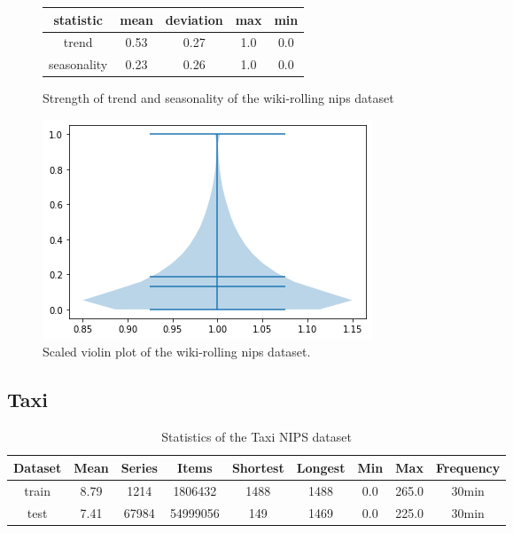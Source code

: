 \begin{figure}[htb]
  \centering
  \begin{center}
    \begin{tabular}{||c | c | c | c | c |}
      \hline
      statistic   & mean & deviation & max & min \\
      \hline
      trend       & 0.53 & 0.27      & 1.0 & 0.0 \\
      \hline
      seasonality & 0.23 & 0.26      & 1.0 & 0.0 \\
      \hline
      \hline
    \end{tabular}
    \caption{Strength of trend and seasonality of the wiki-rolling nips dataset}
  \end{center}
  \endminipage\hfill
  \includegraphics[width=\linewidth]{./img/wiki-rolling_nips_violin.png}
  \caption{Scaled violin plot of the wiki-rolling nips dataset.}
  \label{fig:wiki-rolling_nips_violin}
  \endminipage\hfill
\end{figure}

\clearpage
\subsection{Taxi}
\begin{table}[htb]
  \begin{tabular}{||c | c c c c c c c c ||}
    \hline
    Dataset & Mean & Series & Items    & Shortest & Longest & Min & Max   & Frequency \\ [0.5ex]
    \hline\hline
    train   & 8.79 & 1214   & 1806432  & 1488     & 1488    & 0.0 & 265.0 & 30min     \\
    \hline
    test    & 7.41 & 67984  & 54999056 & 149      & 1469    & 0.0 & 225.0 & 30min     \\
    \hline
  \end{tabular}
  \caption{Statistics of the Taxi NIPS dataset}
\end{table}

